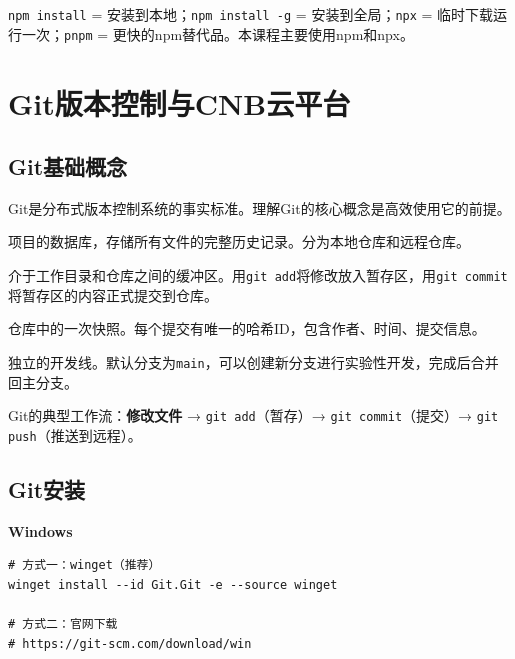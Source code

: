 \begin{notebox}[快速记忆]
\texttt{npm install} = 安装到本地；\texttt{npm install -g} = 安装到全局；\texttt{npx} = 临时下载运行一次；\texttt{pnpm} = 更快的npm替代品。本课程主要使用npm和npx。
\end{notebox}

\section{Git版本控制与CNB云平台}

\subsection{Git基础概念}

Git是分布式版本控制系统的事实标准。理解Git的核心概念是高效使用它的前提。

\begin{theorybox}[Git的四个核心概念]
\begin{description}[leftmargin=2em]
  \item[仓库（Repository）] 项目的数据库，存储所有文件的完整历史记录。分为本地仓库和远程仓库。
  \item[暂存区（Staging Area）] 介于工作目录和仓库之间的缓冲区。用\texttt{git add}将修改放入暂存区，用\texttt{git commit}将暂存区的内容正式提交到仓库。
  \item[提交（Commit）] 仓库中的一次快照。每个提交有唯一的哈希ID，包含作者、时间、提交信息。
  \item[分支（Branch）] 独立的开发线。默认分支为\texttt{main}，可以创建新分支进行实验性开发，完成后合并回主分支。
\end{description}

Git的典型工作流：\textbf{修改文件} → \texttt{git add}（暂存）→ \texttt{git commit}（提交）→ \texttt{git push}（推送到远程）。
\end{theorybox}

\subsection{Git安装}

\textbf{Windows}

\begin{lstlisting}[style=shell]
# 方式一：winget（推荐）
winget install --id Git.Git -e --source winget

# 方式二：官网下载
# https://git-scm.com/download/win
\end{lstlisting}

